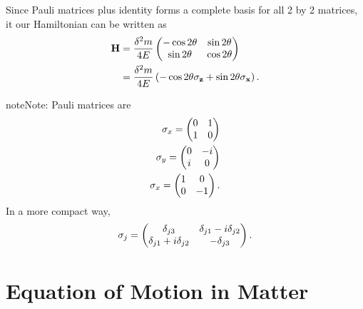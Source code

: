 \documentclass[letterpaper,12pt,english]{sphinxmanual}
\begin{document}
Since Pauli matrices plus identity forms a complete basis for all 2 by 2 matrices, it our Hamiltonian can be written as
\begin{gather}
\begin{split}\mathbf H  &= \frac{\delta^2 m}{4E}\begin{pmatrix} -\cos 2\theta & \sin 2\theta \\ \sin 2\theta & \cos 2\theta \end{pmatrix} \\
& = \frac{\delta^2 m}{4 E} \left( -\cos 2\theta \mathbf{\sigma_z} + \sin 2\theta \mathbf{\sigma_x} \right).\end{split}\notag
\end{gather}
\begin{notice}{note}{Note:}
Pauli matrices are
\begin{gather}
\begin{split}\sigma_x = \begin{pmatrix}0 & 1 \\ 1 & 0\end{pmatrix} \\
\sigma_y = \begin{pmatrix}0 & -i \\ i & 0\end{pmatrix} \\
\sigma_x = \begin{pmatrix}1 & 0 \\ 0 & -1\end{pmatrix}.\end{split}\notag
\end{gather}
In a more compact way,
\begin{gather}
\begin{split}\sigma_j = \begin{pmatrix} \delta_{j3}&\delta_{j1}-i\delta_{j2}\\ \delta_{j1}+i\delta_{j2}&-\delta_{j3}\end{pmatrix}  .\end{split}\notag
\end{gather}\end{notice}


\section{Equation of Motion in Matter}
\label{oscillations:equation-of-motion-in-matter}
\end{document}
